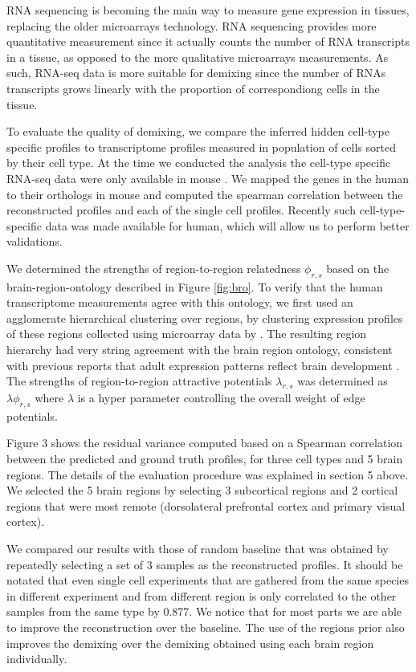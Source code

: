 RNA sequencing is becoming the main way to measure gene expression in tissues, replacing the older microarrays technology. RNA sequencing provides more quantitative measurement since it actually counts the number of RNA transcripts in a tissue, as opposed to the more qualitative microarrays measurements. As such, RNA-seq data is more suitable for demixing since the number of RNAs transcripts grows linearly with the proportion of correspondiong cells in the tissue.

To evaluate the quality of demixing, we compare the inferred hidden cell-type specific profiles to transcriptome profiles measured in population of cells sorted by their cell type. At the time we conducted the analysis the cell-type specific RNA-seq data were only available in mouse \cite{barres2014}. We mapped the genes in the human to their orthologs in mouse and computed the spearman correlation between the reconstructed profiles and each of the single cell profiles. Recently such cell-type-specific data was made available for human, which will allow us to perform better validations. 

We determined the strengths of region-to-region relatedness $\phi_{r,s}$ based on the brain-region-ontology described in Figure \ref{fig:bro}. To verify that the human transcriptome measurements agree with this ontology, we first used an agglomerate hierarchical clustering over regions, by clustering expression profiles of these regions collected using microarray data by \cite{kang2011spatio}. The resulting region hierarchy had very string agreement with the brain region ontology, consistent with previous reports that adult expression patterns reflect brain development \cite{zapala2005}. The strengths of region-to-region attractive potentials $\lambda_{r,s}$ was determined as $\lambda \phi_{r,s}$ where $\lambda$ is a hyper parameter controlling the overall weight of edge potentials. 


Figure 3 shows the residual variance computed based on a Spearman correlation between the predicted and ground truth profiles, for three cell types and 5 brain regions. The details of the evaluation procedure was explained in section 5 above. We selected the 5 brain regions by selecting 3 subcortical regions and 2 cortical regions that were most remote (dorsolateral prefrontal cortex and primary visual cortex).

We compared our results with those of random baseline that was obtained by repeatedly selecting a set of 3 samples as the reconstructed profiles. It should be notated that even single cell experiments that are gathered from the same species in different experiment and from different region is only correlated to the other samples from the same type by 0.877. 
We notice that for most parts we are able to improve the reconstruction over the baseline. The use of the regions prior also improves the demixing over the demixing obtained using each brain region individually.


